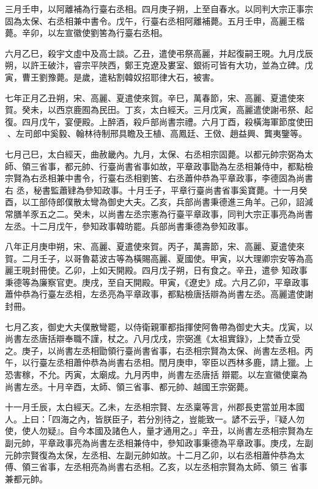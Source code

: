 \begin{pinyinscope}
 三月壬申，以阿離補為行臺右丞相。四月庚子朔，上至自春水。以同判大宗正事宗固為太保、右丞相兼中書令。戊午，行臺右丞相阿離補薨。五月壬申，高麗王楷薨。辛卯，以左宣徽使劉筈為行臺右丞相。



 六月乙巳，殺宇文虛中及高士談。乙丑，遣使弔祭高麗，并起復嗣王晛。九月戊辰朔，以許王破汴，睿宗平陜西，鄭王克遼及婁室、銀術可皆有大功，並為立碑。戊寅，曹王劉豫薨。是歲，遣粘割韓奴招耶律大石，被害。



 七年正月乙丑朔，宋、高麗、夏遣使來賀。辛巳，萬春節，宋、高麗、夏遣使來賀。癸未，以西京鹿囿為民田。丁亥，太白經天。三月戊寅，高麗遣使謝弔祭、起復。四月戊午，宴便殿。上醉酒，殺戶部尚書宗禮。六月丁酉，殺橫海軍節度使田、左司郎中奚毅、翰林待制邢具瞻及王植、高鳳廷、王傚、趙益興、龔夷鑒等。



 七月己巳，太白經天，曲赦畿內。九月，太保、右丞相宗固薨。以都元帥宗弼為太師、領三省事，都元帥、行臺尚書省事如故，平章政事勖為左丞相兼侍中，都點檢宗賢為右丞相兼中書令，行臺右丞相劉筈、右丞蕭仲恭為平章政事，李德固為尚書右
 丞，秘書監蕭肄為參知政事。十月壬子，平章行臺尚書省事奚寶薨。十一月癸酉，以工部侍郎僕散太彎為御史大夫。乙亥，兵部尚書秉德進三角羊。己卯，詔減常膳羊豕五之二。癸未，以尚書左丞宗憲為行臺平章政事，同判大宗正事亮為尚書左丞。十二月戊午，參知政事韓昉罷。兵部尚書秉德為參知政事。



 八年正月庚申朔，宋、高麗、夏遣使來賀。丙子，萬壽節，宋、高麗、夏遣使來賀。二月壬子，以哥魯葛波古等為橫賜高麗、夏國使。甲寅，以大理卿宗安等為高麗王晛封冊使。乙卯，上如天開殿。四月戊子朔，日有食之。辛丑，遣參
 知政事秉德等為廉察官吏。庚戌，至自天開殿。甲寅，《遼史》成。六月乙卯，平章政事蕭仲恭為行臺左丞相，左丞亮為平章政事，都點檢唐括辯為尚書左丞。高麗遣使謝封冊。



 七月乙亥，御史大夫僕散彎罷，以侍衛親軍都指揮使阿魯帶為御史大夫。戊寅，以尚書左丞唐括辯奉職不謹，杖之。八月戊戌，宗弼進《太祖實錄》，上焚香立受之。庚子，以尚書左丞相勖領行臺尚書省事，右丞相宗賢為太保、尚書左丞相。丙午，以行臺左丞相蕭仲恭為尚書右丞相。閏月庚申，宰臣以西林多鹿，請上獵。上恐害稼，不允。丙寅，太廟成。九月丙申，尚書左丞唐括
 辯罷。以左宣徽使稟為尚書左丞。十月辛酉，太師、領三省事、都元帥、越國王宗弼薨。



 十一月壬辰，太白經天。乙未，左丞相宗賢、左丞稟等言，州郡長吏當並用本國人。上曰：「四海之內，皆朕臣子，若分別待之，豈能致一。諺不云乎，『疑人勿使，使人勿疑』。自今本國及諸色人，量才通用之。」辛丑，以尚書左丞相宗賢為左副元帥，平章政事亮為尚書左丞相兼侍中，參知政事秉德為平章政事。庚戌，左副元帥宗賢復為太保，左丞相、左副元帥如故。十二月乙卯，以右丞相蕭仲恭為太傅、領三省事，左丞相亮為尚書右丞相。乙亥，以左丞相宗賢為太師、領三
 省事兼都元帥。




\end{pinyinscope}
